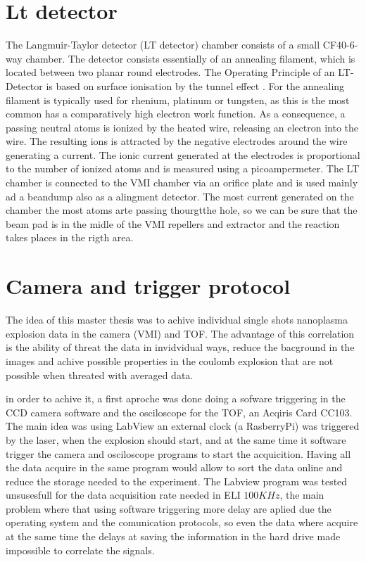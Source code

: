 \section{Lt detector}

The Langmuir-Taylor detector (LT detector)  chamber consists of a small CF40-6-way chamber. The detector consists essentially of an annealing filament, which is located between two planar round electrodes. The Operating Principle of an LT-Detector 
is based on surface ionisation by the tunnel effect \cite{delhuille_optimization_2002}. For the annealing filament is typically used for rhenium, platinum or tungsten, as this is the most common has a comparatively high electron work function. As a consequence, a passing neutral atoms is ionized by the heated wire, releasing an electron into the wire. The resulting ions is attracted by the negative electrodes around the wire generating a current. The ionic current generated at the electrodes is proportional to the number of ionized atoms and is measured using a picoampermeter.
The LT chamber is connected to the VMI chamber via an orifice plate and is used mainly ad a beandump also as a alingment detector. The most current generated on the chamber the most atoms arte passing thourgtthe  hole, so we can be sure that the beam pad is in the midle of the VMI repellers and extractor and the reaction takes places in the rigth area. 

\section{Camera and trigger protocol}

The idea of this master thesis was to achive individual single shots nanoplasma explosion data  in the camera (VMI) and TOF. The advantage of this correlation is the ability of threat the data in invidvidual ways, reduce the bacground in the images and achive possible properties in the coulomb explosion that are not possible when threated with averaged data.

in order to achive it, a first aproche was done doing a sofware triggering in the CCD camera software and the osciloscope for the TOF, an Acqiris Card CC103. The main idea was using LabView an external clock (a RasberryPi) was triggered by the laser, when the explosion should start, and at the same time it software trigger the camera and osciloscope programs to start the acquicition. Having all the data acquire in the same program would allow to sort the data online and reduce the storage needed to the experiment. The Labview program was tested unsusesfull for the data acquisition rate needed in ELI $100KHz$, the main problem where that using software triggering  more delay are aplied due the operating system and the comunication protocols, so even the data where acquire at the same time the delays at saving the information in the hard drive made impossible to correlate the signals.

